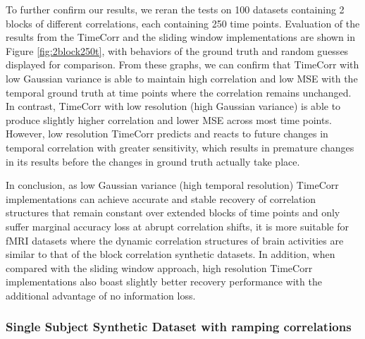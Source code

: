 \documentclass[11pt]{article}
\begin{document}
To further confirm our results, we reran the tests on 100 datasets containing 2 blocks of different correlations, each containing 250 time points. Evaluation of the results from the TimeCorr and the sliding window implementations are shown in Figure \ref{fig:2block250t}, with behaviors of the ground truth and random guesses displayed for comparison. From these graphs, we can confirm that TimeCorr with low Gaussian variance is able to maintain high correlation and low MSE with the temporal ground truth at time points where the correlation remains unchanged. In contrast, TimeCorr with low resolution (high Gaussian variance) is able to produce slightly higher correlation and lower MSE across most time points. However, low resolution TimeCorr predicts and reacts to future changes in temporal correlation with greater sensitivity, which results in premature changes in its results before the changes in ground truth actually take place.

In conclusion, as low Gaussian variance (high temporal resolution) TimeCorr implementations can achieve accurate and stable recovery of correlation structures that remain constant over extended blocks of time points and only suffer marginal accuracy loss at abrupt correlation shifts, it is more suitable for fMRI datasets where the dynamic correlation structures of brain activities are similar to that of the block correlation synthetic datasets. In addition, when compared with the sliding window approach, high resolution TimeCorr implementations also boast slightly better recovery performance with the additional advantage of no information loss.

\subsubsection{Single Subject Synthetic Dataset with ramping correlations}
\end{document}
